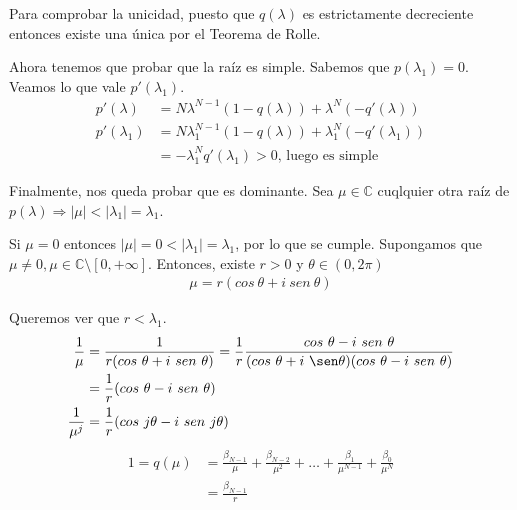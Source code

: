 \documentclass[11pt, a4paper]{article}
\makeatletter
\newif\IfInSansMode
\let\oldsf\sffamily
\renewcommand*{\sffamily}{\oldsf\mathversion{sans}\InSansModetrue}
\let\oldnorm\normalfont
\renewcommand*{\normalfont}{\oldnorm\InSansModefalse\mathversion{normal}}
\renewenvironment{proof}[1][\proofname] {\vspace{-15pt}\par\pushQED{\qed}\normalfont\topsep6\p@\@plus6\p@\relax\trivlist\item[\hskip\labelsep\it#1\@addpunct{.}]\ignorespaces}{\popQED\endtrivlist\@endpefalse}
\numberwithin{equation}{section}
\renewenvironment{proof}[1][\proofname] {\par\pushQED{\qed}\normalfont\topsep6\p@\@plus6\p@\relax\trivlist\item[\hskip\labelsep\itshape\sffamily#1\@addpunct{.}]\ignorespaces}{\popQED\endtrivlist\@endpefalse}
\theoremstyle{theorem-style}
\theoremstyle{definition-style}
\theoremstyle{remark-style}
\theoremstyle{example-style}
\makeatother
\begin{document}
\begin{proof}
         Para comprobar la unicidad, puesto que $q(\lambda)$ es estrictamente decreciente entonces existe una única por el Teorema de Rolle.

        Ahora tenemos que probar que la raíz es simple. Sabemos que $p(\lambda_1) = 0$. Veamos lo que vale $p'(\lambda_1)$. 
        \begin{align*}
            \label{}
            p'(\lambda) &= N\lambda^{N-1}(1 - q(\lambda)) + \lambda^N(-q'(\lambda)) \\
            p'(\lambda_1) &= N\lambda_1^{N-1}(1 - q(\lambda)) + \lambda_1^N(-q'(\lambda_1)) \\
                          &=-\lambda_1^N q'(\lambda_1) > 0 \text{, luego es simple}
        \end{align*}

        Finalmente, nos queda probar que es dominante. Sea $\mu \in \mathbb C$ cuqlquier otra raíz de $p(\lambda) \Rightarrow |\mu| < |\lambda_1| = \lambda_1$.

        Si $\mu = 0$ entonces $|\mu| = 0 < |\lambda_1| = \lambda_1$, por lo que se cumple. Supongamos que $\mu \neq 0, \mu \in \mathbb C \setminus [0, +\infty]$. Entonces, existe $r > 0$ y $\theta \in (0, 2\pi)$
        \begin{align*}
            \label{}
            \mu = r(cos \ \theta + i \ sen \ \theta)
        \end{align*}

        Queremos ver que $ r < \lambda_1$.
        \begin{align*}
            \label{}
            \frac{1}{\mu} &= \frac{1}{r(cos \ \theta + i \ sen \ \theta)} = \frac{1}{r}\frac{cos \ \theta - i \ sen \ \theta}{(cos \ \theta + i \ \sen \theta)(cos \ \theta - i \ sen \ \theta)} \\
                          &= \frac{1}{r}(cos \ \theta - i \ sen \ \theta) \\
            \frac{1}{\mu^j} &=  \frac{1}{r}(cos \ j\theta - i \ sen \ j\theta) 
        \end{align*}
        \begin{align*}
            \label{eq:}
            1 = q(\mu) &= \frac{\beta_{N-1}}{\mu} + \frac{\beta_{N-2}}{\mu^2} + \hdots + \frac{\beta_{1}}{\mu^{N-1}} + \frac{\beta_{0}}{\mu^N} \\
                       &= \frac{\beta_{N-1}}{r} 
        \end{align*}




     \end{proof}
\end{document}
